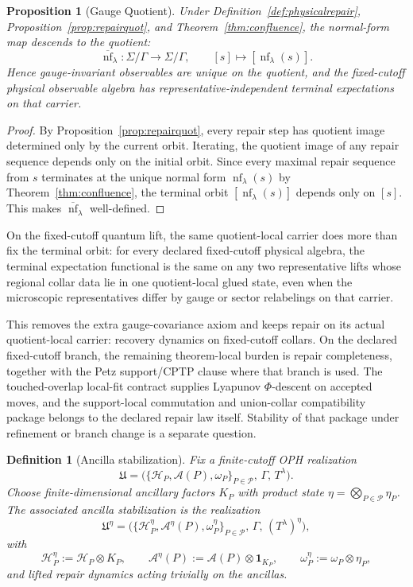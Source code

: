 \documentclass[11pt]{article}
\newtheorem{proposition}[theorem]{Proposition}
\newtheorem{definition}[theorem]{Definition}
\newcommand{\nf}{\operatorname{nf}}
\begin{document}
\begin{proposition}[Gauge Quotient]\label{prop:gauge}
Under Definition~\ref{def:physicalrepair}, Proposition~\ref{prop:repairquot}, and
Theorem~\ref{thm:confluence}, the normal-form map descends to the quotient:
\[
\overline{\nf}_\lambda:\Sigma/\Gamma\to\Sigma/\Gamma,
\qquad
[s]\mapsto [\nf_\lambda(s)].
\]
Hence gauge-invariant observables are unique on the quotient, and the fixed-cutoff physical
observable algebra has representative-independent terminal expectations on that carrier.
\end{proposition}

\begin{proof}
By Proposition~\ref{prop:repairquot}, every repair step has quotient image determined only by the
current orbit. Iterating, the quotient image of any repair sequence depends only on the initial
orbit. Since every maximal repair sequence from \(s\) terminates at the unique normal form
\(\nf_\lambda(s)\) by Theorem~\ref{thm:confluence}, the terminal orbit \([\nf_\lambda(s)]\)
depends only on \([s]\). This makes \(\overline{\nf}_\lambda\) well-defined.
\end{proof}

On the fixed-cutoff quantum lift, the same quotient-local carrier does more than fix the terminal
orbit: for every declared fixed-cutoff physical algebra, the terminal expectation functional is
the same on any two representative lifts whose regional collar data lie in one quotient-local
glued state, even when the microscopic representatives differ by gauge or sector relabelings on
that carrier.

This removes the extra gauge-covariance axiom and keeps repair on its actual quotient-local
carrier: recovery dynamics on fixed-cutoff collars. On the declared fixed-cutoff branch, the
remaining theorem-local burden is repair completeness, together with the Petz support/CPTP clause
where that branch is used. The touched-overlap local-fit contract supplies Lyapunov
\(\Phi\)-descent on accepted moves, and the support-local commutation and union-collar
compatibility package belongs to the declared repair law itself. Stability of that package under
refinement or branch change is a separate question.

\begin{definition}[Ancilla stabilization]\label{def:ancillastab}
Fix a finite-cutoff OPH realization
\[
\mathfrak U=
\bigl(\{\mathcal H_P,\mathcal A(P),\omega_P\}_{P\in\mathcal P},\,\Gamma,\,T^\lambda\bigr).
\]
Choose finite-dimensional ancillary factors \(K_P\) with product state \(\eta=\bigotimes_{P\in\mathcal P}\eta_P\). The associated ancilla stabilization is the realization
\[
\mathfrak U^\eta=
\bigl(\{\mathcal H_P^\eta,\mathcal A^\eta(P),\omega_P^\eta\}_{P\in\mathcal P},\,\Gamma,\,(T^\lambda)^\eta\bigr),
\]
with
\[
\mathcal H_P^\eta:=\mathcal H_P\otimes K_P,\qquad
\mathcal A^\eta(P):=\mathcal A(P)\otimes \mathbf 1_{K_P},\qquad
\omega_P^\eta:=\omega_P\otimes \eta_P,
\]
and lifted repair dynamics acting trivially on the ancillas.
\end{definition}
\end{document}
